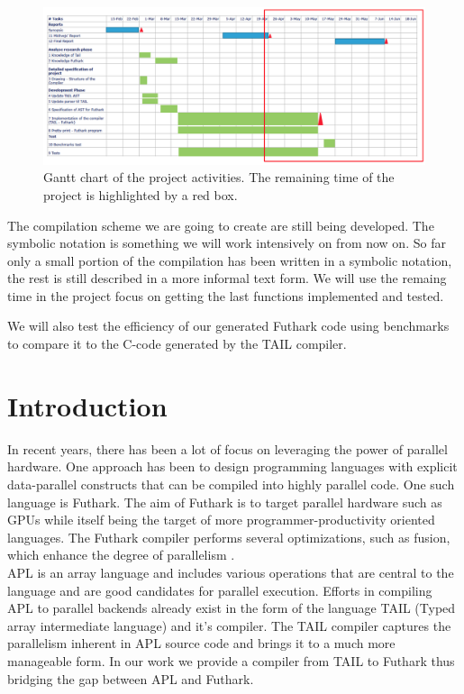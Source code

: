 \documentclass[11pt]{article}
\begin{document}
\begin{figure}%
    \centering
    \includegraphics[width=\textwidth]{midvejsgantt3.png}
    \caption{Gantt chart of the project activities. The remaining time of the project is highlighted by a red box.}
    \label{fig:gantt}
\end{figure}

The compilation scheme we are going to create are still being developed.
The symbolic notation is something we will work intensively on from now on.
So far only a small portion of the compilation has been written in a symbolic notation,
the rest is still described in a more informal text form.
We will use the remaing time in the project focus on getting the last functions implemented and tested.

We will also test the efficiency of our generated Futhark code using benchmarks to compare it to the C-code generated by the TAIL compiler. 


\newpage

\section{Introduction}

In recent years, there has been a lot of focus on leveraging the power of parallel hardware. 
One approach has been to design programming languages with explicit data-parallel constructs that can be compiled 
into highly parallel code. One such language is Futhark. The aim of Futhark is to target parallel hardware such as 
GPUs while itself being the target of more programmer-productivity oriented languages. The Futhark compiler 
performs several optimizations, such as fusion, which enhance the degree of 
parallelism \cite{T.Henriksen&C.Oancea}.\\

APL is an array language and includes various operations that are central to the language and are good candidates 
for parallel execution. Efforts in compiling APL to parallel backends already exist in the form of the language 
TAIL (Typed array intermediate language) and it’s compiler. The TAIL compiler captures the parallelism inherent in 
APL source code and brings it to a much more manageable form. In our work we provide a compiler from TAIL 
to Futhark thus bridging the gap between APL and Futhark.\\
\end{document}
